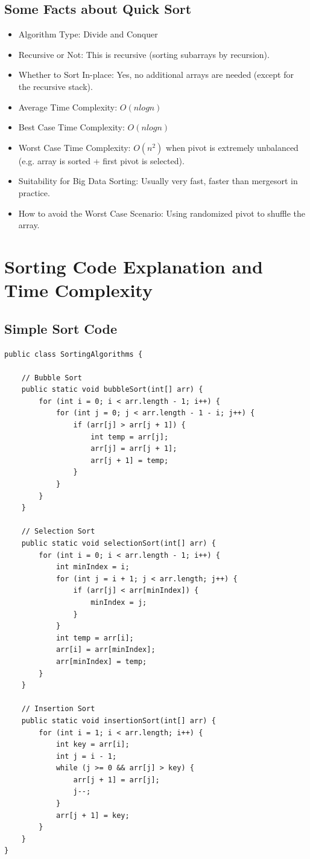 \documentclass[letterpaper,12pt]{article}
\begin{document}
\subsection{Some Facts about Quick Sort}
\begin{itemize}
    \item Algorithm Type: Divide and Conquer
    \item Recursive or Not: This is recursive (sorting subarrays by recursion).
    \item Whether to Sort In-place: Yes, no additional arrays are needed (except for the recursive stack).
    \item Average Time Complexity: $O(n logn)$
    \item Best Case Time Complexity: $O(n logn)$
    \item Worst Case Time Complexity: $O(n^2)$ when pivot is extremely unbalanced (e.g. array is sorted + first pivot is selected).
    \item Suitability for Big Data Sorting: Usually very fast, faster than mergesort in practice.
    \item How to avoid the Worst Case Scenario: Using randomized pivot to shuffle the array.
\end{itemize}

\section{Sorting Code Explanation and Time Complexity}
\subsection{Simple Sort Code}
\begin{verbatim}
public class SortingAlgorithms {

    // Bubble Sort
    public static void bubbleSort(int[] arr) {
        for (int i = 0; i < arr.length - 1; i++) {
            for (int j = 0; j < arr.length - 1 - i; j++) {
                if (arr[j] > arr[j + 1]) {
                    int temp = arr[j];
                    arr[j] = arr[j + 1];
                    arr[j + 1] = temp;
                }
            }
        }
    }

    // Selection Sort
    public static void selectionSort(int[] arr) {
        for (int i = 0; i < arr.length - 1; i++) {
            int minIndex = i;
            for (int j = i + 1; j < arr.length; j++) {
                if (arr[j] < arr[minIndex]) {
                    minIndex = j;
                }
            }
            int temp = arr[i];
            arr[i] = arr[minIndex];
            arr[minIndex] = temp;
        }
    }

    // Insertion Sort
    public static void insertionSort(int[] arr) {
        for (int i = 1; i < arr.length; i++) {
            int key = arr[i];
            int j = i - 1;
            while (j >= 0 && arr[j] > key) {
                arr[j + 1] = arr[j];
                j--;
            }
            arr[j + 1] = key;
        }
    }
}
\end{verbatim}
\end{document}
